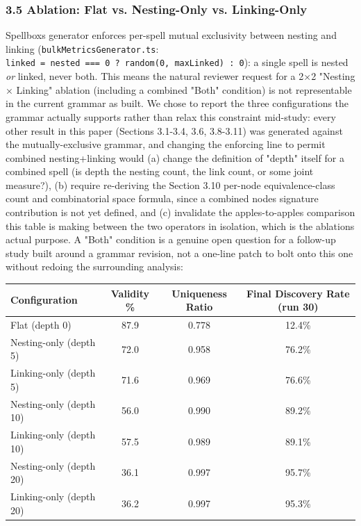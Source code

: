 \documentclass[
  10pt,
  twocolumn]{article}
\begin{document}
\subsubsection{3.5 Ablation: Flat vs. Nesting-Only vs.
Linking-Only}\label{35-ablation-flat-vs-nesting-only-vs-linking-only}

Spellbox\textquotesingle s generator enforces per-spell mutual
exclusivity between nesting and linking
(\texttt{bulkMetricsGenerator.ts}:
\texttt{linked\ =\ nested\ ===\ 0\ ?\ random(0,\ maxLinked)\ :\ 0}): a
single spell is nested \emph{or} linked, never both. This means the
natural reviewer request for a 2×2 "Nesting × Linking" ablation
(including a combined "Both" condition) is not representable in the
current grammar as built. We chose to report the three configurations
the grammar actually supports rather than relax this constraint
mid-study: every other result in this paper (Sections 3.1-3.4, 3.6,
3.8-3.11) was generated against the mutually-exclusive grammar, and
changing the enforcing line to permit combined nesting+linking would (a)
change the definition of "depth" itself for a combined spell (is depth
the nesting count, the link count, or some joint measure?), (b) require
re-deriving the Section 3.10 per-node equivalence-class count and
combinatorial space formula, since a combined node\textquotesingle s
signature contribution is not yet defined, and (c) invalidate the
apples-to-apples comparison this table is making between the two
operators in isolation, which is the ablation\textquotesingle s actual
purpose. A "Both" condition is a genuine open question for a follow-up
study built around a grammar revision, not a one-line patch to bolt onto
this one without redoing the surrounding analysis:

\begin{table}[t]
\centering
\begin{tabular}{@{}lccc@{}}
\toprule
Configuration & Validity \% & Uniqueness Ratio & Final Discovery Rate
(run 30) \\
\midrule
Flat (depth 0) & 87.9 & 0.778 & 12.4\% \\
Nesting-only (depth 5) & 72.0 & 0.958 & 76.2\% \\
Linking-only (depth 5) & 71.6 & 0.969 & 76.6\% \\
Nesting-only (depth 10) & 56.0 & 0.990 & 89.2\% \\
Linking-only (depth 10) & 57.5 & 0.989 & 89.1\% \\
Nesting-only (depth 20) & 36.1 & 0.997 & 95.7\% \\
Linking-only (depth 20) & 36.2 & 0.997 & 95.3\% \\
\bottomrule
\end{tabular}
\end{table}
\end{document}
